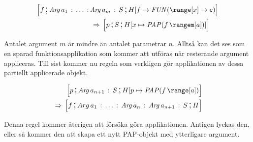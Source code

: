 \documentclass[../Core]{subfiles}
\begin{document}
\begin{align*}
\conf{}{f \csep \mobj{Arg}\, a_{1} \casep \ldots \casep & \mobj{Arg}\, a_{m} \casep S \csep H[f\mapsto\FUN{\range[x]}e} \\
& \rulesep  \conf{}{p\csep S\csep H[x\mapsto\PAP f{\rangem[a]}]}
\end{align*}


Antalet argument $m$ är mindre än antalet parametrar $n$.
Alltså kan det ses som en sparad funktionsapplikation som kommer att
utföras när resterande argument appliceras. Till sist kommer nu
regeln som verkligen gör applikationen av dessa partiellt applicerade
objekt.

\begin{align*}
\conf{}{p \csep \mobj{Arg}\, a_{n+1} \casep S \csep H[p\mapsto\PAP f{\range[a]}} \\
\rulesep \conf{}{f \csep Arg\, a_{1} \casep \ldots \casep \mobj{Arg}\, a_{n} \casep \mobj{Arg}\, a_{n+1} \casep S \csep H}
\end{align*}


Denna regel kommer återigen att försöka göra applikationen. Antigen lyckas
den, eller så kommer den att skapa ett nytt PAP-objekt med ytterligare
argument.
\end{document}
